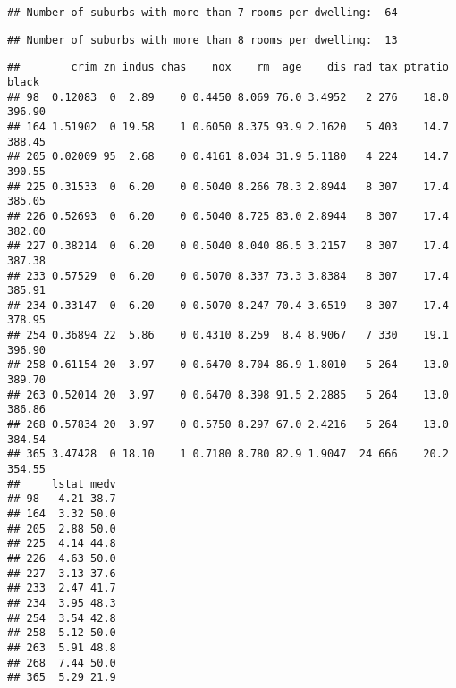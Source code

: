 \documentclass[]{article}
\newenvironment{Shaded}{\begin{snugshade}}{\end{snugshade}}
\newcommand{\DecValTok}[1]{\textcolor[rgb]{0.00,0.00,0.81}{#1}}
\newcommand{\KeywordTok}[1]{\textcolor[rgb]{0.13,0.29,0.53}{\textbf{#1}}}
\newcommand{\NormalTok}[1]{#1}
\newcommand{\OperatorTok}[1]{\textcolor[rgb]{0.81,0.36,0.00}{\textbf{#1}}}
\newcommand{\StringTok}[1]{\textcolor[rgb]{0.31,0.60,0.02}{#1}}
\begin{document}
\begin{verbatim}
## Number of suburbs with more than 7 rooms per dwelling:  64
\end{verbatim}

\begin{Shaded}
\end{Shaded}

\begin{verbatim}
## Number of suburbs with more than 8 rooms per dwelling:  13
\end{verbatim}

\begin{Shaded}
\end{Shaded}

\begin{verbatim}
##        crim zn indus chas    nox    rm  age    dis rad tax ptratio  black
## 98  0.12083  0  2.89    0 0.4450 8.069 76.0 3.4952   2 276    18.0 396.90
## 164 1.51902  0 19.58    1 0.6050 8.375 93.9 2.1620   5 403    14.7 388.45
## 205 0.02009 95  2.68    0 0.4161 8.034 31.9 5.1180   4 224    14.7 390.55
## 225 0.31533  0  6.20    0 0.5040 8.266 78.3 2.8944   8 307    17.4 385.05
## 226 0.52693  0  6.20    0 0.5040 8.725 83.0 2.8944   8 307    17.4 382.00
## 227 0.38214  0  6.20    0 0.5040 8.040 86.5 3.2157   8 307    17.4 387.38
## 233 0.57529  0  6.20    0 0.5070 8.337 73.3 3.8384   8 307    17.4 385.91
## 234 0.33147  0  6.20    0 0.5070 8.247 70.4 3.6519   8 307    17.4 378.95
## 254 0.36894 22  5.86    0 0.4310 8.259  8.4 8.9067   7 330    19.1 396.90
## 258 0.61154 20  3.97    0 0.6470 8.704 86.9 1.8010   5 264    13.0 389.70
## 263 0.52014 20  3.97    0 0.6470 8.398 91.5 2.2885   5 264    13.0 386.86
## 268 0.57834 20  3.97    0 0.5750 8.297 67.0 2.4216   5 264    13.0 384.54
## 365 3.47428  0 18.10    1 0.7180 8.780 82.9 1.9047  24 666    20.2 354.55
##     lstat medv
## 98   4.21 38.7
## 164  3.32 50.0
## 205  2.88 50.0
## 225  4.14 44.8
## 226  4.63 50.0
## 227  3.13 37.6
## 233  2.47 41.7
## 234  3.95 48.3
## 254  3.54 42.8
## 258  5.12 50.0
## 263  5.91 48.8
## 268  7.44 50.0
## 365  5.29 21.9
\end{verbatim}
\end{document}
